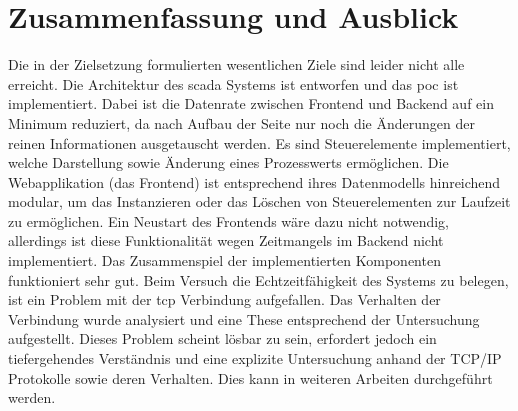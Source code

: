 \chapter{Zusammenfassung und Ausblick}\label{chapter:exit}
Die in der Zielsetzung formulierten wesentlichen Ziele sind leider nicht alle erreicht.
Die Architektur des \ac{scada} Systems ist entworfen und das \ac{poc} ist implementiert.
Dabei ist die Datenrate zwischen Frontend und Backend auf ein Minimum reduziert, 
da nach Aufbau der Seite nur noch die Änderungen der reinen Informationen ausgetauscht werden.
Es sind Steuerelemente implementiert, welche Darstellung sowie Änderung eines Prozesswerts ermöglichen.
Die Webapplikation (das Frontend) ist entsprechend ihres Datenmodells hinreichend modular, um das Instanzieren oder das Löschen von Steuerelementen zur Laufzeit zu ermöglichen.
Ein Neustart des Frontends wäre dazu nicht notwendig, allerdings ist diese Funktionalität wegen Zeitmangels im Backend nicht implementiert.
Das Zusammenspiel der implementierten Komponenten funktioniert sehr gut.
Beim Versuch die Echtzeitfähigkeit des Systems zu belegen, ist ein Problem mit der \ac{tcp} Verbindung aufgefallen.
Das Verhalten der Verbindung wurde analysiert und eine These entsprechend der Untersuchung aufgestellt.
Dieses Problem scheint lösbar zu sein, erfordert jedoch ein tiefergehendes Verständnis und eine explizite Untersuchung anhand der TCP/IP Protokolle sowie deren Verhalten. 
Dies kann in weiteren Arbeiten durchgeführt werden.